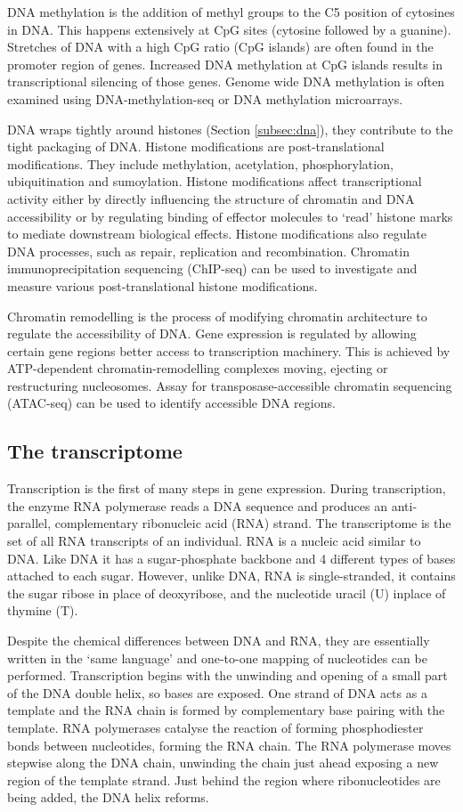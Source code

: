 DNA methylation is the addition of methyl groups to the C5 position of cytosines in DNA.
This happens extensively at CpG sites (cytosine followed by a guanine).
Stretches of DNA with a high CpG ratio (CpG islands) are often found in the promoter region of genes.
Increased DNA methylation at CpG islands results in transcriptional silencing of those genes.
Genome wide DNA methylation is often examined using DNA-methylation-seq or DNA methylation microarrays.

DNA wraps tightly around histones (Section \ref{subsec:dna}), they contribute to the tight packaging of DNA.
Histone modifications are post-translational modifications.
They include methylation, acetylation, phosphorylation, ubiquitination and sumoylation.
Histone modifications affect transcriptional activity either by directly influencing the structure of chromatin and DNA accessibility or by regulating binding of effector molecules to `read' histone marks to mediate downstream biological effects.
Histone modifications also regulate DNA processes, such as repair, replication and recombination\cite{bannister2011regulation}.
Chromatin immunoprecipitation sequencing (ChIP-seq) can be used to investigate and measure various post-translational histone modifications.

Chromatin remodelling is the process of modifying chromatin architecture to regulate the accessibility of DNA.
Gene expression is regulated by allowing certain gene regions better access to transcription machinery.
This is achieved by ATP-dependent chromatin-remodelling complexes moving, ejecting or restructuring nucleosomes.
Assay for transposase-accessible chromatin sequencing (ATAC-seq) can be used to identify accessible DNA regions.


\subsection{The transcriptome}
Transcription is the first of many steps in gene expression.
During transcription, the enzyme RNA polymerase reads a DNA sequence and produces an anti-parallel, complementary ribonucleic acid (RNA) strand.
The transcriptome is the set of all RNA transcripts of an individual.
RNA is a nucleic acid similar to DNA. Like DNA it has a sugar-phosphate backbone and 4 different types of bases attached to each sugar.
However, unlike DNA, RNA is single-stranded, it contains the sugar ribose in place of deoxyribose, and the nucleotide uracil (U) inplace of thymine (T).

Despite the chemical differences between DNA and RNA, they are essentially written in the `same language' and one-to-one mapping of nucleotides can be performed.
Transcription begins with the unwinding and opening of a small part of the DNA double helix, so bases are exposed.
One strand of DNA acts as a template and the RNA chain is formed by complementary base pairing with the template.
RNA polymerases catalyse the reaction of forming phosphodiester bonds between nucleotides, forming the RNA chain.
The RNA polymerase moves stepwise along the DNA chain, unwinding the chain just ahead exposing a new region of the template strand.
Just behind the region where ribonucleotides are being added, the DNA helix reforms.

